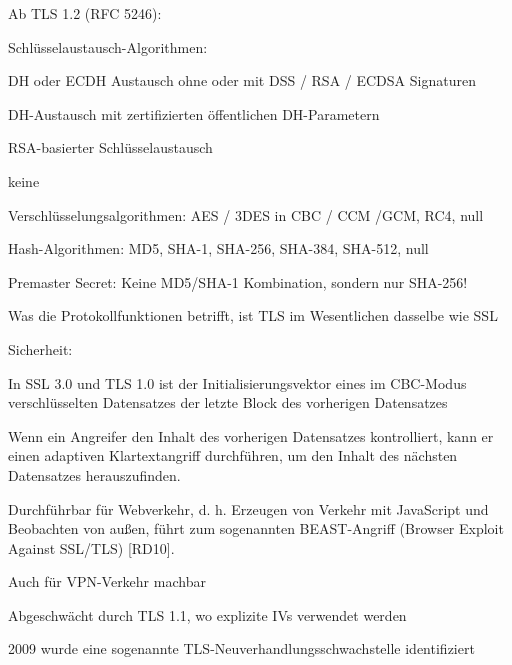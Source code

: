 \documentclass[a4paper]{article}
\begin{document}
\begin{multicols}{3}
\begin{itemize*}
\begin{itemize*}
\begin{itemize*}
                  \end{itemize*}
                  \item       Ab TLS 1.2 (RFC 5246):
                  \begin{itemize*}
                        \item Schlüsselaustausch-Algorithmen:
                        \begin{itemize*} \item DH oder ECDH Austausch ohne oder mit DSS / RSA / ECDSA Signaturen \item DH-Austausch mit zertifizierten öffentlichen DH-Parametern \item RSA-basierter Schlüsselaustausch \item keine \end{itemize*}
                        \item Verschlüsselungsalgorithmen: AES / 3DES in CBC / CCM /GCM, RC4, null
                        \item Hash-Algorithmen: MD5, SHA-1, SHA-256, SHA-384, SHA-512, null
                        \item Premaster Secret: Keine MD5/SHA-1 Kombination, sondern nur SHA-256!
                  \end{itemize*}
                  \item       Was die Protokollfunktionen betrifft, ist TLS im Wesentlichen dasselbe
                  wie SSL
                  \item       Sicherheit:
                  \begin{itemize*}
                        \item In SSL 3.0 und TLS 1.0 ist der Initialisierungsvektor eines im CBC-Modus verschlüsselten Datensatzes der letzte Block des vorherigen Datensatzes
                        \item Wenn ein Angreifer den Inhalt des vorherigen Datensatzes kontrolliert, kann er einen adaptiven Klartextangriff durchführen, um den Inhalt des nächsten Datensatzes herauszufinden.
                        \item Durchführbar für Webverkehr, d. h. Erzeugen von Verkehr mit JavaScript und Beobachten von außen, führt zum sogenannten BEAST-Angriff (Browser Exploit Against SSL/TLS) {[}RD10{]}.
                        \item Auch für VPN-Verkehr machbar
                        \item Abgeschwächt durch TLS 1.1, wo explizite IVs verwendet werden
                        \item 2009 wurde eine sogenannte TLS-Neuverhandlungsschwachstelle identifiziert

\end{itemize*}
\end{itemize*}
\end{itemize*}
\end{multicols}
\end{document}
